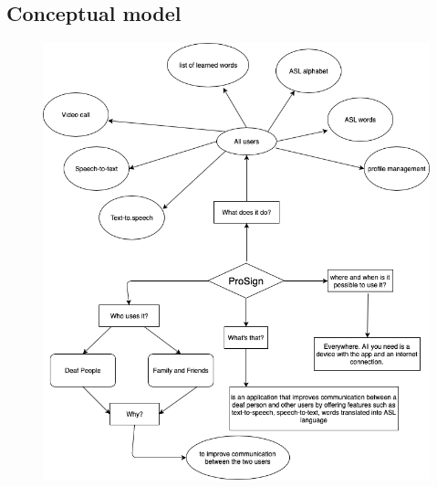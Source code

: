 \clearpage
\subsection{Conceptual model}
\begin{figure}[h]
	\centering
	\includegraphics[width=0.7\linewidth]{Figure/screenshot008}
\end{figure}
